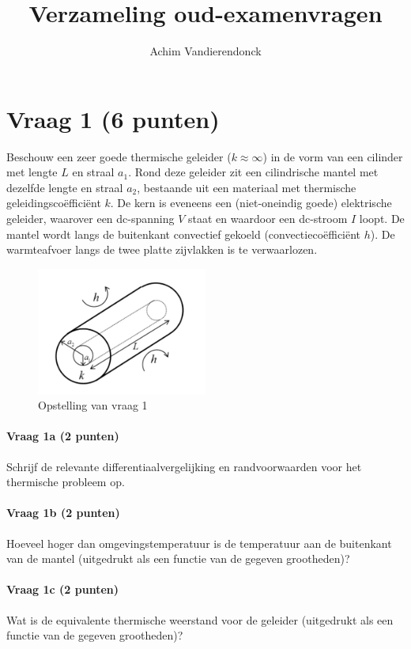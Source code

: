 \documentclass[a4paper]{article}
\title{Verzameling oud-examenvragen}
\author{Achim Vandierendonck}
\date{}
\begin{document}
\maketitle

\section*{Vraag 1 (6 punten)}
Beschouw een zeer goede thermische geleider ($k \approx \infty$) in de vorm van een cilinder met lengte $L$ en straal $a_1$. Rond deze geleider zit een cilindrische mantel met dezelfde lengte en straal $a_2$, bestaande uit een materiaal met thermische geleidingscoëfficiënt $k$. De kern is eveneens een (niet-oneindig goede) elektrische geleider, waarover een dc-spanning $V$ staat en waardoor een dc-stroom $I$ loopt. De mantel wordt langs de buitenkant convectief gekoeld (convectiecoëfficiënt $h$). De warmteafvoer langs de twee platte zijvlakken is te verwaarlozen.

\begin{figure}[ht]
    \centering
    \includegraphics[width=0.5\textwidth]{vraag1}
    \caption{Opstelling van vraag 1}
    \label{fig:vraag1}
\end{figure}

\paragraph{Vraag 1a (2 punten)}
Schrijf de relevante differentiaalvergelijking en randvoorwaarden voor het thermische probleem op.

\paragraph{Vraag 1b (2 punten)}
Hoeveel hoger dan omgevingstemperatuur is de temperatuur aan de buitenkant van de mantel (uitgedrukt als een functie van de gegeven grootheden)?

\paragraph{Vraag 1c (2 punten)}
Wat is de equivalente thermische weerstand voor de geleider (uitgedrukt als een functie van de gegeven grootheden)?
\end{document}

